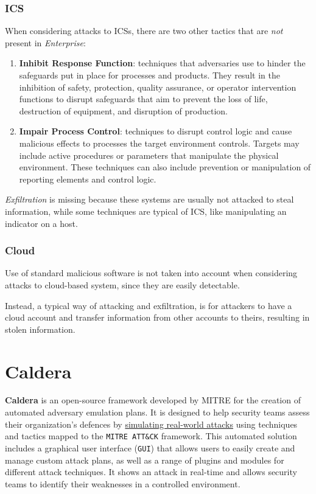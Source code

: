 \subsubsection{ICS}
When considering attacks to ICSs,
there are two other tactics that are \textit{not} present in \textit{Enterprise}:
\begin{enumerate}
   \item \textbf{Inhibit Response Function}:
   techniques that adversaries use to hinder the
   safeguards put in place for processes and products.
   They result in the inhibition of
   safety, protection, quality assurance, or operator intervention functions to
   disrupt safeguards that aim to prevent the loss of life, destruction of
   equipment, and disruption of production.
   \item \textbf{Impair Process Control}:
   techniques to disrupt control logic and cause
   malicious effects to processes the target environment controls. 
   Targets may include active procedures or parameters that manipulate the
   physical environment. These techniques can also include prevention or
   manipulation of reporting elements and control logic.
\end{enumerate}

\textit{Exfiltration} is missing because these systems are usually not attacked to steal information,
while some techniques are typical of ICS,
like manipulating an indicator on a host.

\subsubsection{Cloud}
Use of standard malicious software is not taken into account when considering attacks to cloud-based system,
since they are easily detectable.

Instead, a typical way of attacking and exfiltration,
is for attackers to have a cloud account and transfer information from other accounts to theirs,
resulting in stolen information.


\section{Caldera}
\textbf{Caldera} is an open-source framework developed by MITRE for the
creation of automated adversary emulation plans.
It is designed to help security teams assess their
organization’s defences by \ul{simulating real-world attacks}
using techniques and tactics mapped to the \texttt{MITRE ATT\&CK} framework.
This automated solution includes a graphical user interface
(\texttt{GUI}) that allows users to easily create and manage custom
attack plans, as well as a range of plugins and modules for
different attack techniques.
It shows an attack in real-time
and allows security teams to identify their weaknesses in a
controlled environment.

